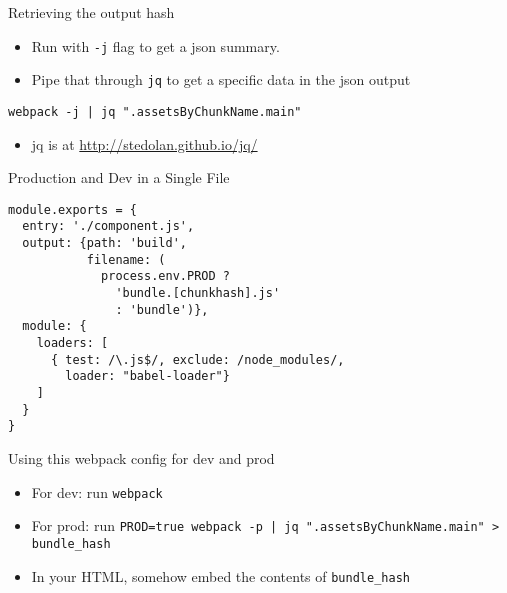 \documentclass[presentation]{beamer}
\begin{document}
\begin{frame}[fragile,label={sec:orgheadline9}]{Retrieving the output hash}
 \begin{itemize}
\item Run with \texttt{-j} flag to get a json summary.
\item Pipe that through \texttt{jq} to get a specific data in the json output
\end{itemize}

\begin{verbatim}
webpack -j | jq ".assetsByChunkName.main"
\end{verbatim}
\begin{itemize}
\item jq is at \url{http://stedolan.github.io/jq/}
\end{itemize}
\end{frame}

\begin{frame}[fragile,label={sec:orgheadline10}]{Production and Dev in a Single File}
 \begin{verbatim}
module.exports = {
  entry: './component.js',
  output: {path: 'build',
           filename: (
             process.env.PROD ?
               'bundle.[chunkhash].js'
               : 'bundle')},
  module: {
    loaders: [
      { test: /\.js$/, exclude: /node_modules/,
        loader: "babel-loader"}
    ]
  }
}
\end{verbatim}
\end{frame}

\begin{frame}[fragile,label={sec:orgheadline11}]{Using this webpack config for dev and prod}
 \begin{itemize}
\item For dev: run \texttt{webpack}
\item For prod: run \texttt{PROD=true webpack -p | jq ".assetsByChunkName.main" >
  bundle\_hash}
\item In your HTML, somehow embed the contents of \texttt{bundle\_hash}
\end{itemize}
\end{frame}
\end{document}
